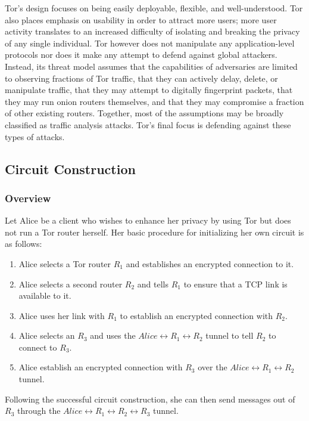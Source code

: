 Tor's design focuses on being easily deployable, flexible, and well-understood. Tor also places emphasis on usability in order to attract more users; more user activity translates to an increased difficulty of isolating and breaking the privacy of any single individual. Tor however does not manipulate any application-level protocols nor does it make any attempt to defend against global attackers. Instead, its threat model assumes that the capabilities of adversaries are limited to observing fractions of Tor traffic, that they can actively delay, delete, or manipulate traffic, that they may attempt to digitally fingerprint packets, that they may run onion routers themselves, and that they may compromise a fraction of other existing routers. Together, most of the assumptions may be broadly classified as traffic analysis attacks. Tor's final focus is defending against these types of attacks.\cite{dingledine2004tor}

\subsection{Circuit Construction}

\subsubsection{Overview}

Let Alice be a client who wishes to enhance her privacy by using Tor but does not run a Tor router herself. Her basic procedure for initializing her own circuit is as follows:

\begin{enumerate}
	\item Alice selects a Tor router $ R_{1} $ and establishes an encrypted connection to it.
	\item Alice selects a second router $ R_{2} $ and tells $ R_{1} $ to ensure that a TCP link is available to it. 
	\item Alice uses her link with $ R_{1} $ to establish an encrypted connection with $ R_{2} $.
	\item Alice selects an $ R_{3} $ and uses the $ Alice \leftrightarrow R_{1} \leftrightarrow R_{2} $ tunnel to tell $ R_{2} $ to connect to $ R_{3} $.
	\item Alice establish an encrypted connection with $ R_{3} $ over the $ Alice \leftrightarrow R_{1} \leftrightarrow R_{2} $ tunnel.
\end{enumerate}

Following the successful circuit construction, she can then send messages out of $ R_{3} $ through the $ Alice \leftrightarrow R_{1} \leftrightarrow R_{2} \leftrightarrow R_{3} $ tunnel.

